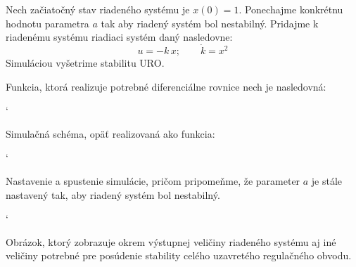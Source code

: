 \documentclass[a4paper, 10pt, ]{article}
\begin{document}
\begin{centering}


    \vspace{-2mm}

    \figcaption{}

    \vspace{2mm}

    \label{figsc_ar02_fig03_1}

\end{centering}





Nech začiatočný stav riadeného systému je $x(0) = 1$. Ponechajme konkrétnu hodnotu parametra $a$ tak aby riadený systém bol nestabilný. Pridajme k riadenému systému riadiaci systém daný nasledovne:
	\begin{equation}
		u = -k\, x; \qquad \dot{k} = x^2
	\end{equation}
Simuláciou vyšetrime stabilitu URO.


\noindent
Funkcia, ktorá realizuje potrebné diferenciálne rovnice nech je nasledovná:


{\catcode`

}

\noindent
Simulačná schéma, opäť realizovaná ako funkcia:

{\catcode`

}


\noindent
Nastavenie a spustenie simulácie, pričom pripomeňme, že parameter $a$ je stále nastavený tak, aby riadený systém bol nestabilný.

{\catcode`

}

\noindent
Obrázok, ktorý zobrazuje okrem výstupnej veličiny riadeného systému aj iné veličiny potrebné pre posúdenie stability celého uzavretého regulačného obvodu.
\end{document}
